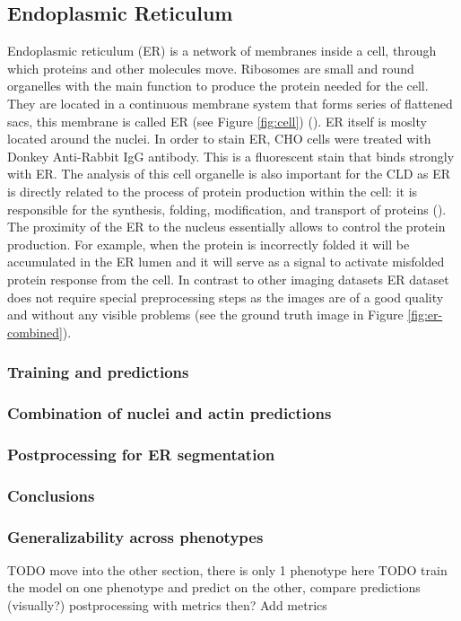 \subsection{Endoplasmic Reticulum}
    Endoplasmic reticulum (ER) is a network of membranes inside a cell, through which proteins and other molecules move. Ribosomes are small and round organelles with the main function to produce the protein needed for the cell. They are located in a continuous membrane system that forms series of flattened sacs, this membrane is called ER (see Figure \ref{fig:cell}) (\cite{er}). ER itself is moslty located around the nuclei. In order to stain ER, CHO cells were treated with Donkey Anti-Rabbit IgG antibody. This is a fluorescent stain that binds strongly with ER. The analysis of this cell organelle is also important for the CLD as ER is directly related to the process of protein production within the cell: it is responsible for the synthesis, folding, modification, and transport of proteins (\cite{er_2}). The proximity of the ER to the nucleus essentially allows to control the protein production. For example, when the protein is incorrectly folded it will be accumulated in the ER lumen and it will serve as a signal to activate misfolded protein response from the cell. In contrast to other imaging datasets ER dataset does not require special preprocessing steps as the images are of a good quality and without any visible problems (see the ground truth image in Figure \ref{fig:er-combined}).
    
    \subsubsection{Training and predictions}
        
    \subsubsection{Combination of nuclei and actin predictions}
        
    \subsubsection{Postprocessing for ER segmentation}
        
    \subsubsection{Conclusions}
        
    \subsubsection{Generalizability across phenotypes}
        TODO move into the other section, there is only 1 phenotype here
        TODO train the model on one phenotype and predict on the other, compare predictions (visually?) 
        postprocessing with metrics then?
        Add metrics

    